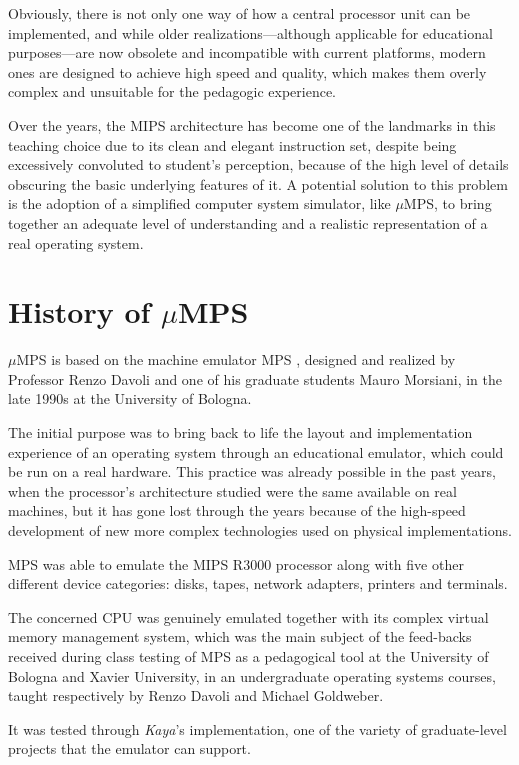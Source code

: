 \documentclass[12pt,a4paper,openright,twoside]{report}
\begin{document}
Obviously, there is not only one way of how a central processor unit can be implemented, and while older realizations---although applicable for educational purposes---are now obsolete and incompatible with current platforms, modern ones are designed to achieve high speed and quality, which makes them overly complex and unsuitable for the pedagogic experience.

Over the years, the MIPS architecture has become one of the landmarks in this teaching choice due to its clean and elegant instruction set, despite being excessively convoluted to student’s perception, because of the high level of details obscuring the basic underlying features of it.
A potential solution to this problem is the adoption of a simplified computer system simulator, like $\mu$MPS, to bring together an adequate level of understanding and a realistic representation of a real operating system.

\section{History of $\mu$MPS}
$\mu$MPS is based on the machine emulator MPS \cite{mps}, designed and realized by Professor Renzo Davoli and one of his graduate students Mauro Morsiani, in the late 1990s at the University of Bologna.

The initial purpose was to bring back to life the layout and implementation experience of an operating system through an educational emulator, which could be run on a real hardware.
This practice was already possible in the past years, when the processor's architecture studied were the same available on real machines, but it has gone lost through the years because of the high-speed development of new more complex technologies used on physical implementations.

MPS was able to emulate the MIPS R3000 processor along with five other different device categories: disks, tapes, network adapters, printers and terminals.

The concerned CPU was genuinely emulated together with its complex virtual memory management system, which was the main subject of the feed-backs received during class testing of MPS as a pedagogical tool at the University of Bologna and Xavier University, in an undergraduate operating systems courses, taught respectively by Renzo Davoli and Michael Goldweber.

It was tested through \textit{Kaya}'s \cite{kaya} implementation, one of the variety of graduate-level projects that the emulator can support.
\end{document}
